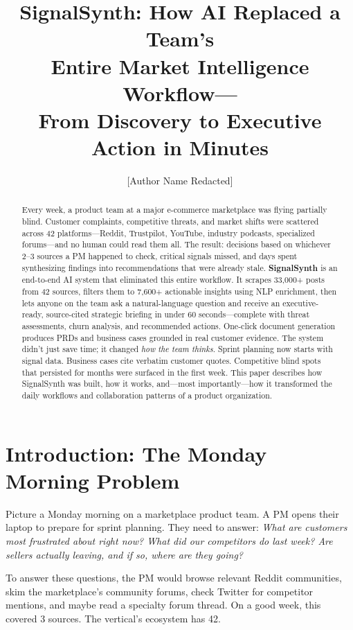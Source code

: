 \documentclass[11pt]{article}
\title{\textbf{SignalSynth: How AI Replaced a Team's\\Entire Market Intelligence Workflow---\\From Discovery to Executive Action in Minutes}}
\author{[Author Name Redacted]}
\affil{[Company Redacted], [Business Unit Redacted]}
\date{}
\begin{document}
\maketitle

\begin{abstract}
Every week, a product team at a major e-commerce marketplace was flying partially blind. Customer complaints, competitive threats, and market shifts were scattered across 42 platforms---Reddit, Trustpilot, YouTube, industry podcasts, specialized forums---and no human could read them all. The result: decisions based on whichever 2--3 sources a PM happened to check, critical signals missed, and days spent synthesizing findings into recommendations that were already stale. \textbf{SignalSynth} is an end-to-end AI system that eliminated this entire workflow. It scrapes 33,000+ posts from 42 sources, filters them to 7,600+ actionable insights using NLP enrichment, then lets anyone on the team ask a natural-language question and receive an executive-ready, source-cited strategic briefing in under 60 seconds---complete with threat assessments, churn analysis, and recommended actions. One-click document generation produces PRDs and business cases grounded in real customer evidence. The system didn't just save time; it changed \textit{how the team thinks}. Sprint planning now starts with signal data. Business cases cite verbatim customer quotes. Competitive blind spots that persisted for months were surfaced in the first week. This paper describes how SignalSynth was built, how it works, and---most importantly---how it transformed the daily workflows and collaboration patterns of a product organization.
\end{abstract}

\section{Introduction: The Monday Morning Problem}

Picture a Monday morning on a marketplace product team. A PM opens their laptop to prepare for sprint planning. They need to answer: \textit{What are customers most frustrated about right now? What did our competitors do last week? Are sellers actually leaving, and if so, where are they going?}

To answer these questions, the PM would browse relevant Reddit communities, skim the marketplace's community forums, check Twitter for competitor mentions, and maybe read a specialty forum thread. On a good week, this covered 3 sources. The vertical's ecosystem has 42.
\end{document}
